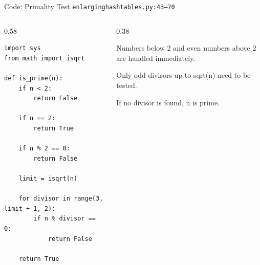 \documentclass[aspectratio=169,11pt]{beamer}
\begin{document}
\begin{frame}[fragile]{Code: Primality Test}
\scriptsize
{} \texttt{enlarginghashtables.py:43--70}

\vspace{0.08cm}
\begin{columns}[T,totalwidth=\textwidth]
\begin{column}{0.58\textwidth}
\begin{lstlisting}[style=cpcode]
import sys
from math import isqrt

def is_prime(n):
    if n < 2:
        return False

    if n == 2:
        return True

    if n % 2 == 0:
        return False

    limit = isqrt(n)

    for divisor in range(3, limit + 1, 2):
        if n % divisor == 0:
            return False

    return True
\end{lstlisting}
\end{column}
\begin{column}{0.38\textwidth}
\begin{tightitemize}
  \item Numbers below 2 and even numbers above 2 are handled immediately.
  \item Only odd divisors up to sqrt(n) need to be tested.
  \item If no divisor is found, n is prime.
\end{tightitemize}
\end{column}
\end{columns}
\end{frame}
\end{document}
